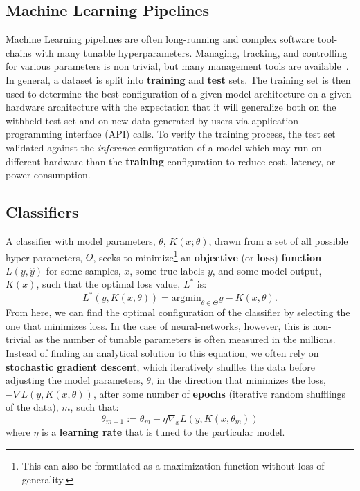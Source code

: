 \documentclass[conference]{IEEEtran}
\begin{document}
\subsection{Machine Learning Pipelines}
Machine Learning pipelines are often long-running and complex software tool-chains with many tunable hyperparameters. Managing, tracking, and controlling for various parameters is non trivial, but many management tools are available~\cite{dvc, hydra, k8s}. In general, a dataset is split into \textbf{training} and \textbf{test} sets. The training set is then used to determine the best configuration of a given model architecture on a given hardware architecture with the expectation that it will generalize both on the withheld test set and on new data generated by users via application programming interface (API) calls. To verify the training process, the test set validated against the \textit{inference} configuration of a model which may run on different hardware than the \textbf{training} configuration to reduce cost, latency, or power consumption. 

\subsection{Classifiers}

A classifier with model parameters, $\theta$, $K(x; \theta)$, drawn from a set of all possible hyper-parameters, $\Theta$, seeks to minimize\footnote{This can also be formulated as a maximization function without loss of generality.} an \textbf{objective} (or \textbf{loss}) \textbf{function} $L(y, \hat{y})$ for some samples, $x$, some true labels $y$, and some model output, $K(x)$, such that the optimal loss value, $L^*$ is:
\[
L^*(y, K(x, \theta)) = \mathrm{argmin}_{\theta \in \Theta} y - K(x, \theta).
\]
From here, we can find the optimal configuration of the classifier by selecting the one that minimizes loss. In the case of neural-networks, however, this is non-trivial as the number of tunable parameters is often measured in the millions. Instead of finding an analytical solution to this equation, we often rely on \textbf{stochastic gradient descent}, which iteratively shuffles the data before adjusting the model parameters, $\theta$, in the direction that minimizes the loss, $-\nabla L(y, K(x, \theta))$, after some number of \textbf{epochs} (iterative random shufflings of the data), $m$, such that:
\begin{equation}
\theta_{m+1} := \theta_{m} - \eta \nabla_x L(y, K(x, \theta_m))
\label{eq:sgd}
\end{equation}
where $\eta$ is a \textbf{learning rate} that is tuned to the particular model. 
\end{document}
